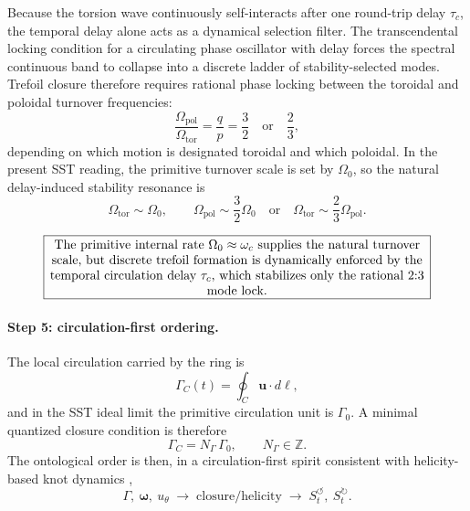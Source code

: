 \documentclass[11pt,a4paper]{article}
\newcommand{\boxedstatement}[1]{\fbox{\parbox{0.86\linewidth}{\centering #1}}}
\begin{document}
Because the torsion wave continuously self-interacts after one round-trip delay $\tau_c$, the temporal delay alone acts as a dynamical selection filter. The transcendental locking condition for a circulating phase oscillator with delay forces the spectral continuous band to collapse into a discrete ladder of stability-selected modes. Trefoil closure therefore requires rational phase locking between the toroidal and poloidal turnover frequencies:
\begin{equation}
\frac{\Omega_{\mathrm{pol}}}{\Omega_{\mathrm{tor}}}
=
\frac{q}{p}
=
\frac{3}{2}
\quad\text{or}\quad
\frac{2}{3},
\label{eq:trefoilphaselockTrefoil}
\end{equation}
depending on which motion is designated toroidal and which poloidal. In the present SST reading, the primitive turnover scale is set by \(\Omega_0\), so the natural delay-induced stability resonance is
\begin{equation}
\Omega_{\mathrm{tor}}\sim \Omega_0,
\qquad
\Omega_{\mathrm{pol}}\sim \frac{3}{2}\Omega_0
\quad\text{or}\quad
\Omega_{\mathrm{tor}}\sim \frac{2}{3}\Omega_{\mathrm{pol}}.
\label{eq:trefoilOmega0Trefoil}
\end{equation}

\begin{equation}
\boxedstatement{The primitive internal rate $\Omega_0 \approx \omega_c$ supplies the natural turnover scale, but discrete trefoil formation is dynamically enforced by the temporal circulation delay $\tau_c$, which stabilizes only the rational $2{:}3$ mode lock.}
\label{eq:boxedOmega0Lock}
\end{equation}

\paragraph{Step 5: circulation-first ordering.}
The local circulation carried by the ring is
\begin{equation}
\Gamma_C(t)=\oint_C \mathbf{u}\cdot d\boldsymbol{\ell},
\label{eq:loopcirculationTrefoil}
\end{equation}
and in the SST ideal limit the primitive circulation unit is \(\Gamma_0\). A minimal quantized closure condition is therefore
\begin{equation}
\Gamma_C = N_\Gamma\,\Gamma_0,
\qquad
N_\Gamma\in\mathbb Z.
\label{eq:circulationquantizationTrefoil}
\end{equation}
The ontological order is then, in a circulation-first spirit consistent with helicity-based knot dynamics \cite{Moffatt1969},
\begin{equation}
\Gamma,\ \boldsymbol{\omega},\ u_\theta
\;\longrightarrow\;
\text{closure/helicity}
\;\longrightarrow\;
S_t^{\boldsymbol{\circlearrowleft}},\ S_t^{\boldsymbol{\circlearrowright}}.
\label{eq:circulationbeforeclockTrefoil}
\end{equation}
\end{document}
